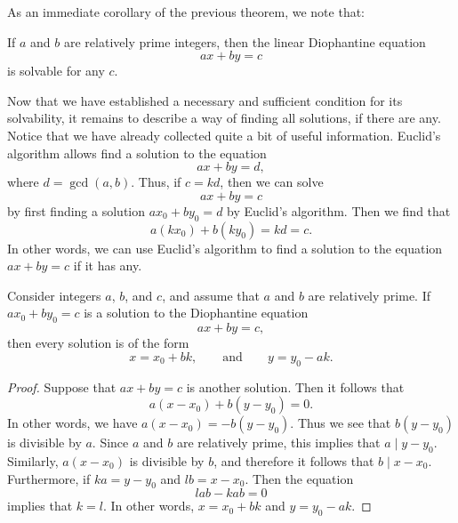 As an immediate corollary of the previous theorem, we note that:

\begin{corollary}
  If $a$ and $b$ are relatively prime integers, then the linear Diophantine equation
  \begin{equation*}
    ax + by = c
  \end{equation*}
  is solvable for any $c$.
\end{corollary}

Now that we have established a necessary and sufficient condition for its solvability, it remains to describe a way of finding all solutions, if there are any. Notice that we have already collected quite a bit of useful information. Euclid's algorithm allows find a solution to the equation
\begin{equation*}
  ax + by = d,
\end{equation*}
where $d=\gcd(a,b)$. Thus, if $c=kd$, then we can solve
\begin{equation*}
  ax + by = c
\end{equation*}
by first finding a solution $ax_0+by_0 = d$ by Euclid's algorithm. Then we find that
\begin{equation*}
  a(kx_0)+b(ky_0)=kd = c.
\end{equation*}
In other words, we can use Euclid's algorithm to find a solution to the equation $ax+by=c$ if it has any.

\begin{proposition}
  Consider integers $a$, $b$, and $c$, and assume that $a$ and $b$ are relatively prime. If $ax_0 + by_0=c$ is a solution to the Diophantine equation
  \begin{equation*}
    ax + by = c,
  \end{equation*}
  then every solution is of the form
  \begin{equation*}
    x = x_0 + bk,\qquad\text{and}\qquad y = y_0-ak.
  \end{equation*}
\end{proposition}

\begin{proof}
  Suppose that $ax+by=c$ is another solution. Then it follows that
  \begin{equation*}
    a(x-x_0)+b(y-y_0)=0.
  \end{equation*}
  In other words, we have $a(x-x_0)=-b(y-y_0)$. Thus we see that $b(y-y_0)$ is divisible by $a$. Since $a$ and $b$ are relatively prime, this implies that $a\mid y-y_0$. Similarly, $a(x-x_0)$ is divisible by $b$, and therefore it follows that $b\mid x-x_0$. Furthermore, if $ka=y-y_0$ and $lb=x-x_0$. Then the equation
  \begin{equation*}
    lab - kab = 0
  \end{equation*}
  implies that $k=l$. In other words, $x=x_0+bk$ and $y=y_0-ak$.
\end{proof}

